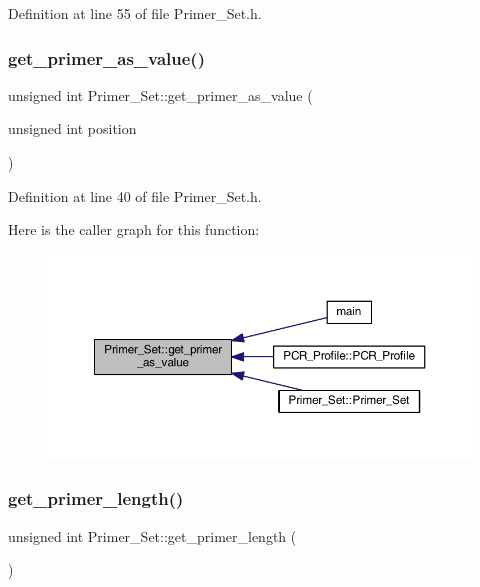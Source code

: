 Definition at line 55 of file Primer\+\_\+\+Set.\+h.

\mbox{\label{class_primer___set_a7c639e643b36dea739026862f12a64d4}} 
\subsubsection{\texorpdfstring{get\+\_\+primer\+\_\+as\+\_\+value()}{get\_primer\_as\_value()}}
{\footnotesize\ttfamily unsigned int Primer\+\_\+\+Set\+::get\+\_\+primer\+\_\+as\+\_\+value (\begin{DoxyParamCaption}\item[{unsigned int}]{position }\end{DoxyParamCaption})\hspace{0.3cm}{\ttfamily [inline]}}



Definition at line 40 of file Primer\+\_\+\+Set.\+h.

Here is the caller graph for this function\+:
\nopagebreak
\begin{figure}[H]
\begin{center}
\leavevmode
\includegraphics[width=350pt]{class_primer___set_a7c639e643b36dea739026862f12a64d4_icgraph}
\end{center}
\end{figure}
\mbox{\label{class_primer___set_af53fe2ae85933f04a5cc2e159a3ed49f}} 
\subsubsection{\texorpdfstring{get\+\_\+primer\+\_\+length()}{get\_primer\_length()}}
{\footnotesize\ttfamily unsigned int Primer\+\_\+\+Set\+::get\+\_\+primer\+\_\+length (\begin{DoxyParamCaption}{ }\end{DoxyParamCaption})\hspace{0.3cm}{\ttfamily [inline]}}



